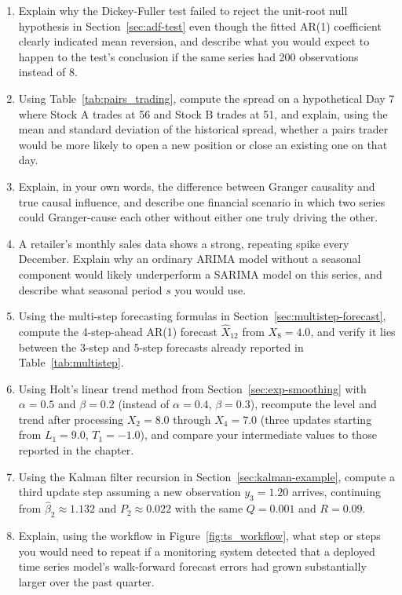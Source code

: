 \documentclass[../ai_in_finance]{subfiles}
\begin{document}
\begin{enumerate}[exercises]
    \item Explain why the Dickey-Fuller test failed to reject the unit-root null hypothesis in Section~\ref{sec:adf-test} even though the fitted AR(1) coefficient clearly indicated mean reversion, and describe what you would expect to happen to the test's conclusion if the same series had 200 observations instead of 8.
    \item Using Table~\ref{tab:pairs_trading}, compute the spread on a hypothetical Day 7 where Stock A trades at 56 and Stock B trades at 51, and explain, using the mean and standard deviation of the historical spread, whether a pairs trader would be more likely to open a new position or close an existing one on that day.
    \item Explain, in your own words, the difference between Granger causality and true causal influence, and describe one financial scenario in which two series could Granger-cause each other without either one truly driving the other.
    \item A retailer's monthly sales data shows a strong, repeating spike every December. Explain why an ordinary ARIMA model without a seasonal component would likely underperform a SARIMA model on this series, and describe what seasonal period $s$ you would use.
    \item Using the multi-step forecasting formulas in Section~\ref{sec:multistep-forecast}, compute the 4-step-ahead AR(1) forecast $\hat X_{12}$ from $X_8=4.0$, and verify it lies between the 3-step and 5-step forecasts already reported in Table~\ref{tab:multistep}.
    \item Using Holt's linear trend method from Section~\ref{sec:exp-smoothing} with $\alpha=0.5$ and $\beta=0.2$ (instead of $\alpha=0.4$, $\beta=0.3$), recompute the level and trend after processing $X_2=8.0$ through $X_4=7.0$ (three updates starting from $L_1=9.0$, $T_1=-1.0$), and compare your intermediate values to those reported in the chapter.
    \item Using the Kalman filter recursion in Section~\ref{sec:kalman-example}, compute a third update step assuming a new observation $y_3=1.20$ arrives, continuing from $\hat\beta_2\approx 1.132$ and $P_2\approx 0.022$ with the same $Q=0.001$ and $R=0.09$.
    \item Explain, using the workflow in Figure~\ref{fig:ts_workflow}, what step or steps you would need to repeat if a monitoring system detected that a deployed time series model's walk-forward forecast errors had grown substantially larger over the past quarter.

\end{enumerate}
\end{document}
